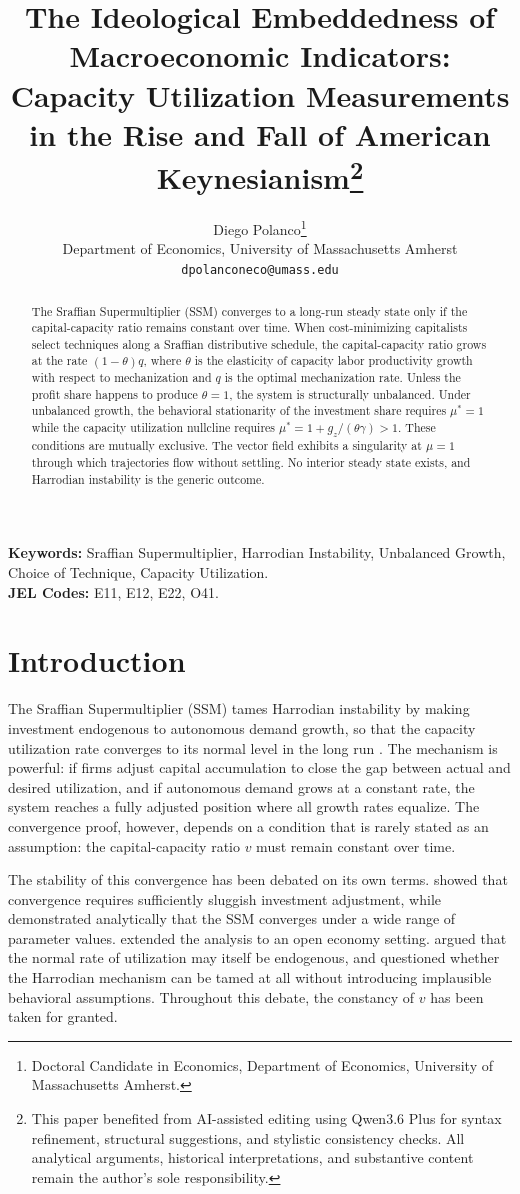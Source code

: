 \documentclass[12pt, a4paper]{article}
\title{The Ideological Embeddedness of Macroeconomic Indicators: \\
Capacity Utilization Measurements in the Rise and Fall of American Keynesianism\thanks{This paper benefited from AI-assisted editing using Qwen3.6 Plus for syntax refinement, structural suggestions, and stylistic consistency checks. All analytical arguments, historical interpretations, and substantive content remain the author's sole responsibility.}}
\author{Diego Polanco\thanks{Doctoral Candidate in Economics, Department of Economics, University of Massachusetts Amherst.}\\
Department of Economics, University of Massachusetts Amherst\\
\texttt{dpolanconeco@umass.edu}}
\date{}
\theoremstyle{definition}
\theoremstyle{remark}
\begin{document}
\maketitle

\begin{abstract}
The Sraffian Supermultiplier (SSM) converges to a long-run steady state only if the capital-capacity ratio remains constant over time. When cost-minimizing capitalists select techniques along a Sraffian distributive schedule, the capital-capacity ratio grows at the rate $(1 - \theta)q$, where $\theta$ is the elasticity of capacity labor productivity growth with respect to mechanization and $q$ is the optimal mechanization rate. Unless the profit share happens to produce $\theta = 1$, the system is structurally unbalanced. Under unbalanced growth, the behavioral stationarity of the investment share requires $\mu^* = 1$ while the capacity utilization nullcline requires $\mu^* = 1 + g_z/(\theta\gamma) > 1$. These conditions are mutually exclusive. The vector field exhibits a singularity at $\mu = 1$ through which trajectories flow without settling. No interior steady state exists, and Harrodian instability is the generic outcome.
\end{abstract}

\noindent \textbf{Keywords:} Sraffian Supermultiplier, Harrodian Instability, Unbalanced Growth, Choice of Technique, Capacity Utilization. \\
\textbf{JEL Codes:} E11, E12, E22, O41.

\vspace{1cm}

\section{Introduction}

The Sraffian Supermultiplier (SSM) tames Harrodian instability by making investment endogenous to autonomous demand growth, so that the capacity utilization rate converges to its normal level in the long run \citep{serrano1995, freitas2015, serrano2017}. The mechanism is powerful: if firms adjust capital accumulation to close the gap between actual and desired utilization, and if autonomous demand grows at a constant rate, the system reaches a fully adjusted position where all growth rates equalize. The convergence proof, however, depends on a condition that is rarely stated as an assumption: the capital-capacity ratio $v$ must remain constant over time.

The stability of this convergence has been debated on its own terms. \citet{allain2015} showed that convergence requires sufficiently sluggish investment adjustment, while \citet{lavoie2016} demonstrated analytically that the SSM converges under a wide range of parameter values. \citet{nah2017} extended the analysis to an open economy setting. \citet{nikiforos2013} argued that the normal rate of utilization may itself be endogenous, and \citet{skott2017} questioned whether the Harrodian mechanism can be tamed at all without introducing implausible behavioral assumptions. Throughout this debate, the constancy of $v$ has been taken for granted.
\end{document}
